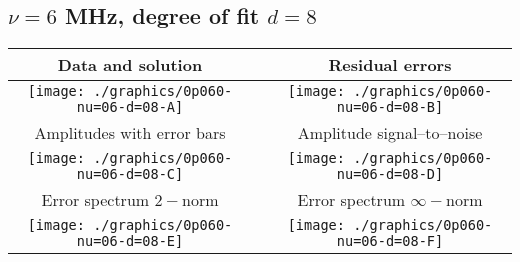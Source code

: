 

% 

\clearpage{}
\break{}

\subsection{$\nu = 6$ MHz, degree of fit $d = 8$}

\begin{table}[h]
    \begin{center}
        \begin{tabular}{ccc}
            Data and solution & \quad & Residual errors \\\hline
            \texttt{[image: ./graphics/0p060-nu=06-d=08-A]} &&
            \texttt{[image: ./graphics/0p060-nu=06-d=08-B]} \\[15pt]
            Amplitudes with error bars && Amplitude signal--to--noise \\\hline
            \texttt{[image: ./graphics/0p060-nu=06-d=08-C]} &&
            \texttt{[image: ./graphics/0p060-nu=06-d=08-D]} \\[15pt]
            Error spectrum $2-$norm && Error spectrum $\infty-$norm \\\hline
            \texttt{[image: ./graphics/0p060-nu=06-d=08-E]} &&
            \texttt{[image: ./graphics/0p060-nu=06-d=08-F]} \\[15pt]
        \end{tabular}
    \end{center}
\label{fig:elev=60, nu=6}
\end{table}



\endinput
